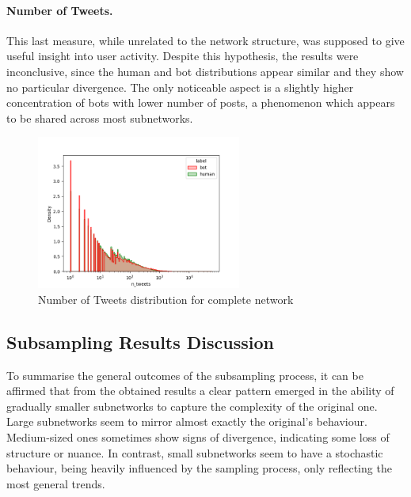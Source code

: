 \documentclass[12pt, a4paper]{article}
\begin{document}
        \paragraph{Number of Tweets.} This last measure, while unrelated to the network structure, was supposed to give useful insight into user activity. Despite this hypothesis, the results were inconclusive, since the human and bot distributions appear similar and they show no particular divergence. The only noticeable aspect is a slightly higher concentration of bots with lower number of posts, a phenomenon which appears to be shared across most subnetworks.
        \begin{figure}[H]
        	\centering
        	\includegraphics[width=0.6\textwidth]{complete_n_tweets_distribution.png}
            \caption{Number of Tweets distribution for complete network}
      	\end{figure}
    \subsection{Subsampling Results Discussion} \label{subsampling_results}
    	To summarise the general outcomes of the subsampling process, it can be affirmed that from the obtained results a clear pattern emerged in the ability of gradually smaller subnetworks to capture the complexity of the original one. Large subnetworks seem to mirror almost exactly the original's behaviour. Medium-sized ones sometimes show signs of divergence, indicating some loss of structure or nuance. In contrast, small subnetworks seem to have a stochastic behaviour, being heavily influenced by the sampling process, only reflecting the most general trends.
\end{document}
